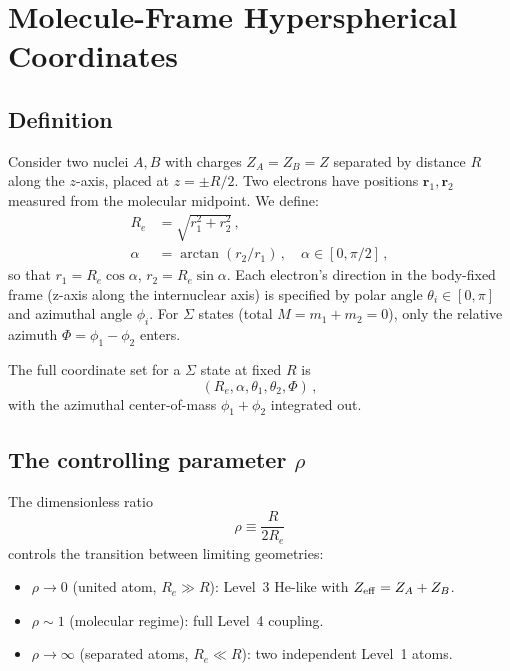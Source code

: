 \documentclass[aps,pra,twocolumn,superscriptaddress,longbibliography]{revtex4-2}
\begin{document}
\section{Molecule-Frame Hyperspherical Coordinates}
\label{sec:coords}

\subsection{Definition}

Consider two nuclei $A,B$ with charges $Z_A = Z_B = Z$ separated by
distance $R$ along the $z$-axis, placed at $z = \pm R/2$.  Two electrons
have positions $\bm{r}_1, \bm{r}_2$ measured from the molecular midpoint.
We define:
\begin{align}
  R_e &= \sqrt{r_1^2 + r_2^2}\,,
    \label{eq:Re} \\
  \alpha &= \arctan(r_2/r_1)\,,\quad \alpha\in[0,\pi/2]\,,
    \label{eq:alpha}
\end{align}
so that $r_1 = R_e\cos\alpha$, $r_2 = R_e\sin\alpha$.  Each electron's
direction in the body-fixed frame (z-axis along the internuclear axis) is
specified by polar angle $\theta_i \in [0,\pi]$ and azimuthal angle
$\phi_i$.  For $\Sigma$ states (total $M = m_1 + m_2 = 0$), only the
relative azimuth $\Phi = \phi_1 - \phi_2$ enters.

The full coordinate set for a $\Sigma$ state at fixed $R$ is
\begin{equation}
  (R_e, \alpha, \theta_1, \theta_2, \Phi)\,,
  \label{eq:coords}
\end{equation}
with the azimuthal center-of-mass $\phi_1 + \phi_2$ integrated out.

\subsection{The controlling parameter \texorpdfstring{$\rho$}{rho}}

The dimensionless ratio
\begin{equation}
  \rho \equiv \frac{R}{2R_e}
  \label{eq:rho}
\end{equation}
controls the transition between limiting geometries:
\begin{itemize}
  \item $\rho \to 0$ (united atom, $R_e \gg R$): Level~3 He-like
    with $Z_{\rm eff} = Z_A + Z_B$.
  \item $\rho \sim 1$ (molecular regime): full Level~4 coupling.
  \item $\rho \to \infty$ (separated atoms, $R_e \ll R$): two
    independent Level~1 atoms.
\end{itemize}
\end{document}
